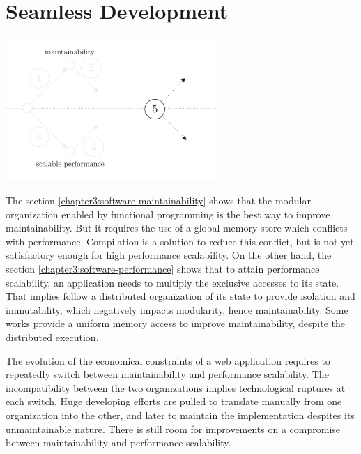 \section{Seamless Development} \label{chapter3:objectives}

\begin{center}
\includegraphics[width=0.6\textwidth]{../ressources/state-of-the-art-5.pdf}
\end{center}

The section \ref{chapter3:software-maintainability} shows that the modular organization enabled by functional programming is the best way to improve maintainability.
But it requires the use of a global memory store which conflicts with performance.
Compilation is a solution to reduce this conflict, but is not yet satisfactory enough for high performance scalability.
On the other hand, the section \ref{chapter3:software-performance} shows that to attain performance scalability, an application needs to multiply the exclusive accesses to its state.
That implies follow a distributed organization of its state to provide isolation and immutability, which negatively impacts modularity, hence maintainability.
Some works provide a uniform memory access to improve maintainability, despite the distributed execution.

The evolution of the economical constraints of a web application requires to repeatedly switch between maintainability and performance scalability.
The incompatibility between the two organizations implies technological ruptures at each switch.
Huge developing efforts are pulled to translate manually from one organization into the other, and later to maintain the implementation despites its unmaintainable nature.
There is still room for improvements on a compromise between maintainability and performance scalability.

